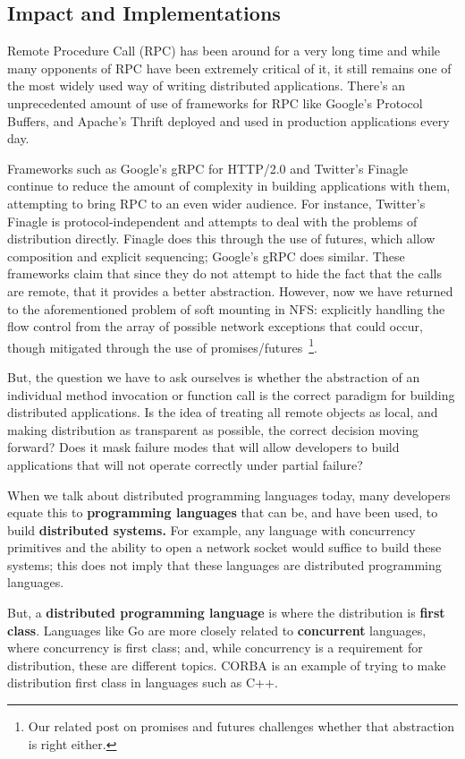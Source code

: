 \subsection{Impact and Implementations}

Remote Procedure Call (RPC) has been around for a very long time and while many opponents of RPC have been extremely critical of it, it still remains one of the most widely used way of writing distributed applications.  There's an unprecedented amount of use of frameworks for RPC like Google's Protocol Buffers, and Apache's Thrift deployed and used in production applications every day.

Frameworks such as Google's gRPC for HTTP/2.0 and Twitter's Finagle continue to reduce the amount of complexity in building applications with them, attempting to bring RPC to an even wider audience.  For instance, Twitter's Finagle is protocol-independent and attempts to deal with the problems of distribution directly.  Finagle does this through the use of futures, which allow composition and explicit sequencing; Google's gRPC does similar.  These frameworks claim that since they do not attempt to hide the fact that the calls are remote, that it provides a better abstraction.  However, now we have returned to the aforementioned problem of soft mounting in NFS: explicitly handling the flow control from the array of possible network exceptions that could occur, though mitigated through the use of promises/futures~\footnote{Our related post on promises and futures challenges whether that abstraction is right either.}.

But, the question we have to ask ourselves is whether the abstraction of an individual method invocation or function call is the correct paradigm for building distributed applications.  Is the idea of treating all remote objects as local, and making distribution as transparent as possible, the correct decision moving forward?  Does it mask failure modes that will allow developers to build applications that will not operate correctly under partial failure?

When we talk about distributed programming languages today, many developers equate this to \textbf{programming languages} that can be, and have been used, to build \textbf{distributed systems.}  For example, any language with concurrency primitives and the ability to open a network socket would suffice to build these systems; this does not imply that these languages are distributed programming languages.

But, a \textbf{distributed programming language} is where the  distribution is \textbf{first class}.  Languages like Go are more closely related to \textbf{concurrent} languages, where concurrency is first class; and, while concurrency is a requirement for distribution, these are different topics.  CORBA is an example of trying to make distribution first class in languages such as C++.

